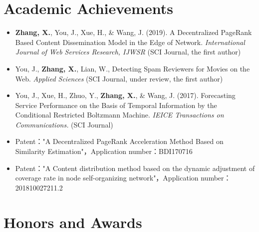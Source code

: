 \documentclass{resume}
\begin{document}

\section{Academic Achievements}
\begin{itemize}[parsep=0.5ex]
  \item \textbf{Zhang, X.}, You, J., Xue, H., \& Wang, J. (2019). A Decentralized PageRank Based Content Dissemination Model in the Edge of Network. \textit{International Journal of Web Services Research, IJWSR} (SCI Journal, the first author)
  \item You, J., \textbf{Zhang, X.}, Lian, W., Detecting Spam Reviewers for Movies on the Web. \textit{Applied Sciences} (SCI Journal, under review, the first author)
  \item You, J., Xue, H., Zhuo, Y., \textbf{Zhang, X.}, \& Wang, J. (2017). Forecasting Service Performance on the Basis of Temporal Information by the Conditional Restricted Boltzmann Machine. \textit{IEICE Transactions on Communications.} (SCI Journal)
  \item Patent："A Decentralized PageRank Acceleration Method Based on Similarity Estimation"，Application number：BDI170716
  \item Patent："A Content distribution method based on the dynamic adjustment of coverage rate in node self-organizing network"，Application number：201810027211.2
\end{itemize}

\section{Honors and Awards}
\end{document}
